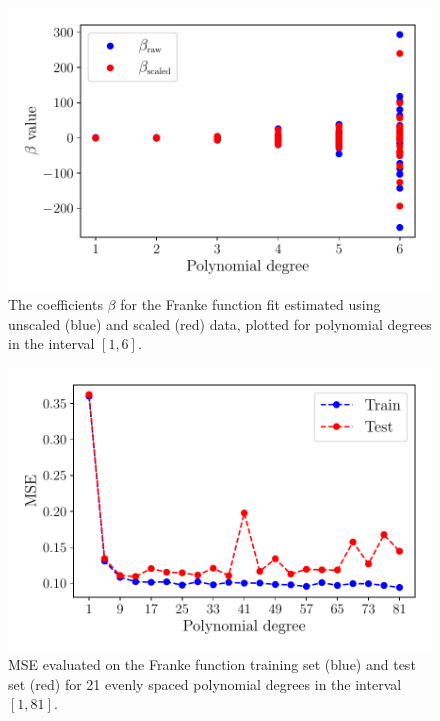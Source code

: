 \documentclass[aps,pra,english,notitlepage,reprint,nofootinbib]{revtex4-1}  %
\begin{document}
\begin{figure}[h!]
  \vspace*{-5pt}
  \centering %
  \includegraphics[width=\columnwidth]{../figs/a_beta_scaled_vs_raw.pdf}
  \caption{The coefficients $\beta$ for the Franke function fit estimated using unscaled (blue) and scaled (red) data, plotted for polynomial degrees in the interval $[1,6]$.}\label{fig:a beta scaled vs raw}
  \vspace*{-5pt}
\end{figure}

\begin{figure}[h!]
  \vspace*{-5pt}
  \centering %
  \includegraphics[width=\columnwidth]{../figs/e_MSE_train_test.pdf}
  \caption{MSE evaluated on the Franke function training set (blue) and test set (red) for 21 evenly spaced polynomial degrees in the interval $[1, 81]$.}\label{fig:e train test}
  \vspace*{-5pt}
\end{figure}
\end{document}
